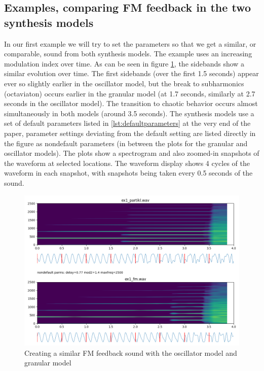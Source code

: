 \documentclass[runningheads,a4paper]{llncs}
\begin{document}
\subsection{Examples, comparing FM feedback in the two synthesis models}
In our first example we will try to set the parameters so that we get a similar, or comparable, sound from both synthesis models. The example uses an increasing modulation index over time. As can be seen in figure \ref{fig:ex1}, the sidebands show a similar evolution over time. The first sidebands (over the first 1.5 seconds) appear ever so slightly earlier in the oscillator model, but the break to subharmonics (octaviaton) occurs earlier in the granular model (at 1.7 seconds, similarly at 2.7 seconds in the oscillator model). The transition to chaotic behavior occurs almost simultaneously in both models (around 3.5 seconds). The synthesis models use a set of default parameters listed in \ref{lst:defaultparameters} at the very end of the paper, parameter settings deviating from the default setting are listed directly in the figure as nondefault parameters (in between the plots for the granular and oscillator models). The plots show a spectrogram and also zoomed-in snapshots of the waveform at selected locations. The waveform display shows 4 cycles of the waveform in each snapshot, with snapshots being taken every 0.5 seconds of the sound.

\begin{figure}
	\centering
	\includegraphics[width=.95\textwidth]{ex1_compare.png}
	\caption{Creating a similar FM feedback sound with the oscillator model and granular model}
	\label{fig:ex1}
\end{figure}
\end{document}

